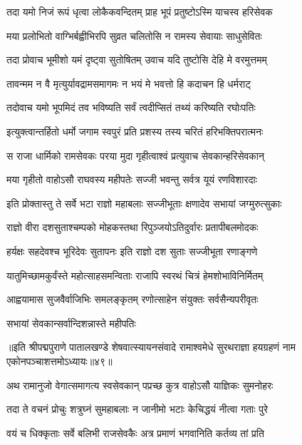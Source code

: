 \twolineshloka
{तदा यमो निजं रूपं धृत्वा लोकैकवन्दितम्}
{प्राह भूपं प्रतुष्टोऽस्मि याचस्व हरिसेवक}%

\twolineshloka
{मया प्रलोभितो वाग्भिर्बह्वीभिरपि सुव्रत}
{चलितोसि न रामस्य सेवायाः साधुसेवितः}%

\twolineshloka
{तदा प्रोवाच भूमीशो यमं दृष्ट्वा सुतोषितम्}
{उवाच यदि तुष्टोसि देहि मे वरमुत्तमम्}%

\twolineshloka
{तावन्मम न वै मृत्युर्यावद्रामसमागमः}
{न भयं मे भवत्तो हि कदाचन हि धर्मराट्}%

\twolineshloka
{तदोवाच यमो भूपमिदं तव भविष्यति}
{सर्वं त्वदीप्सितं तथ्यं करिष्यति रघोःपतिः}%

\twolineshloka
{इत्युक्त्वान्तर्हितो धर्मो जगाम स्वपुरं प्रति}
{प्रशस्य तस्य चरितं हरिभक्तिपरात्मनः}%

\twolineshloka
{स राजा धार्मिको रामसेवकः परया मुदा}
{गृहीत्वाश्वं प्रत्युवाच सेवकान्हरिसेवकान्}%

\twolineshloka
{मया गृहीतो वाहोऽसौ राघवस्य महीपतेः}
{सज्जी भवन्तु सर्वत्र यूयं रणविशारदाः}%

\twolineshloka
{इति प्रोक्तास्तु ते सर्वे भटा राज्ञो महाबलाः}
{सज्जीभूताः क्षणादेव सभायां जग्मुरुत्सुकाः}%

\twolineshloka
{राज्ञो वीरा दशसुताश्चम्पको मोहकस्तथा}
{रिपुञ्जयोऽतिदुर्वारः प्रतापीबलमोदकः}%

\twolineshloka
{हर्यक्षः सहदेवश्च भूरिदेवः सुतापनः}
{इति राज्ञो दश सुताः सज्जीभूता रणाङ्गणे}%

\twolineshloka
{यातुमिच्छामकुर्वंस्ते महोत्साहसमन्विताः}
{राजापि स्वरथं चित्रं हेमशोभाविनिर्मितम्}%

\twolineshloka
{आह्वयामास सुजवैर्वाजिभिः समलङ्कृतम्}
{रणोत्साहेन संयुक्तः सर्वसैन्यपरीवृतः}%

\onelineshloka
{सभायां सेवकान्सर्वान्दिशन्नास्ते महीपतिः}%

{॥इति श्रीपद्मपुराणे पातालखण्डे शेषवात्स्यायनसंवादे रामाश्वमेधे सुरथराज्ञा हयग्रहणं नाम एकोनपञ्चाशत्तमोऽध्यायः॥४९॥}

\resetShloka


\twolineshloka
{अथ रामानुजो वेगात्समागत्य स्वसेवकान्}
{पप्रच्छ कुत्र वाहोऽसौ याज्ञिकः सुमनोहरः}%

\twolineshloka
{तदा ते वचनं प्रोचुः शत्रुघ्नं सुमहाबलाः}
{न जानीमो भटाः केचिद्धयं नीत्वा गताः पुरे}%

\twolineshloka
{वयं च धिक्कृताः सर्वे बलिभी राजसेवकैः}
{अत्र प्रमाणं भगवानिति कर्तव्य तां प्रति}%

